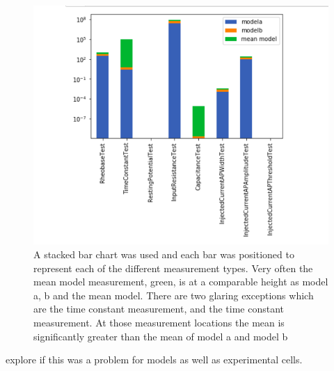 \begin{figure}
    \centering
    \includegraphics{figures/mean_model_mean_test2.png}
    \caption[bar charts that reveal disparity between mean model and mean measurement]{A stacked bar chart was used and each bar was positioned to represent each of the different measurement types. Very often the mean model measurement, green, is at a comparable height as model a, b and the mean model. There are two glaring exceptions which are the time constant measurement, and the time constant measurement. At those measurement locations the mean is significantly greater than the mean of model a and model b}
    \label{fig:my_label}
\end{figure}

explore if this was a problem for models as well as experimental cells.